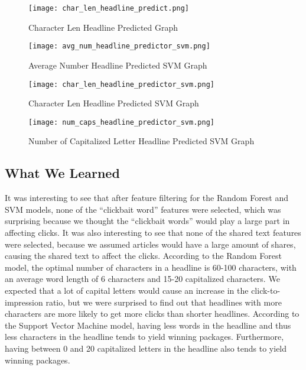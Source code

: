 \documentclass{article}
\begin{document}
\begin{figure}[h]
\centering
\texttt{[image: char\_len\_headline\_predict.png]}
\caption{Character Len Headline Predicted Graph}
\end{figure} 

\begin{figure}[h]
\centering
\texttt{[image: avg\_num\_headline\_predictor\_svm.png]}
\caption{Average Number Headline Predicted SVM Graph}
\end{figure} 

\begin{figure}[h]
\centering
\texttt{[image: char\_len\_headline\_predictor\_svm.png]}
\caption{Character Len Headline Predicted SVM Graph}
\end{figure} 

\begin{figure}[h]
\centering
\texttt{[image: num\_caps\_headline\_predictor\_svm.png]}
\caption{Number of Capitalized Letter Headline Predicted SVM Graph}
\end{figure} 
\vspace{12em}
\subsection{What We Learned}
It was interesting to see that after feature filtering for the Random Forest and SVM models, none of the “clickbait word” features were selected, which was surprising because we thought the “clickbait words” would play a large part in affecting clicks. It was also interesting to see that none of the shared text features were selected, because we assumed articles would have a large amount of shares, causing the shared text to affect the clicks.  According to the Random Forest model,  the optimal number of characters in a headline is 60-100 characters, with an average word length of 6 characters and 15-20 capitalized characters. We expected that a lot of capital letters would cause an increase in the click-to-impression ratio, but we were surprised to find out that headlines with more characters are more likely to get more clicks than shorter headlines.  According to the Support Vector Machine model,  having less words in the headline and thus less characters in the headline tends to yield winning packages.  Furthermore,  having between 0 and 20 capitalized letters in the headline also tends to yield winning packages. 
\end{document}

